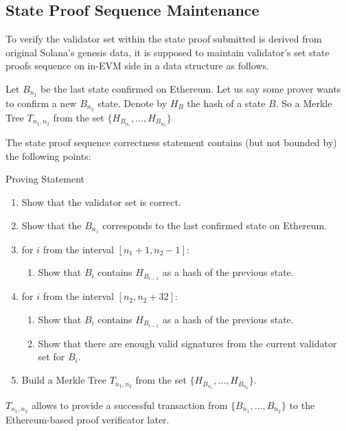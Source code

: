 \subsection{State Proof Sequence Maintenance}
\label{section:architecture:stateseq}

To verify the validator set within the state proof submitted is derived from 
original Solana's genesis data, it is supposed to maintain validator's set state
proofs sequence on in-EVM side in a data structure as follows.

Let $B_{n_1}$ be the last state confirmed on Ethereum. Let us say some prover 
wants to confirm a new $B_{n_2}$ state. Denote by $H_{B}$ the hash of a state $B$.
So a Merkle Tree $T_{n_1, n_2}$ from the set $\{H_{B_{n_1}}, ..., H_{B_{n_2}}\}$


The state proof sequence correctness statement contains (but not bounded by) the following points:
\begin{algorithm}[h!]
    \caption{Proving Statement}
    \label{circuit}
    \begin{enumerate}
        \item Show that the validator set is correct.
        \item Show that the $B_{n_1}$ corresponds to the last confirmed state on Ethereum.
        \item for $i$ from the interval $[n_1 + 1, n_2 - 1]$:
        \begin{enumerate}
            \item Show that $B_{i}$ contains $H_{B_{i - 1}}$ as a hash of the previous state.
        \end{enumerate}
        \item for $i$ from the interval $[n_2, n_2 + 32]$:
        \begin{enumerate}
            \item Show that $B_{i}$ contains $H_{B_{i - 1}}$ as a hash of the previous state.
            \item Show that there are enough valid signatures from the current validator set for $B_{i}$.
        \end{enumerate}
        \item Build a Merkle Tree $T_{n_1, n_2}$ from the set $\{H_{B_{n_1}}, ..., H_{B_{n_2}}\}$.
    \end{enumerate}
\end{algorithm}

$T_{n_1, n_2}$ allows to provide a successful transaction from $\{B_{n_1}, ..., B_{n_2}\}$ to the Ethereum-based proof verificator later.
